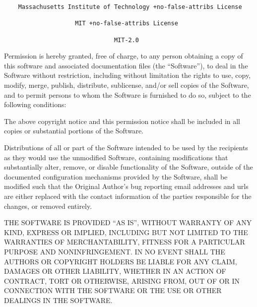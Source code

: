 \begin{verbatim}
    Massachusetts Institute of Technology +no-false-attribs License

                    MIT +no-false-attribs License

                               MIT-2.0
\end{verbatim}

Permission is hereby granted, free of charge, to any person obtaining a
copy of this software and associated documentation files (the
``Software''), to deal in the Software without restriction, including
without limitation the rights to use, copy, modify, merge, publish,
distribute, sublicense, and/or sell copies of the Software, and to
permit persons to whom the Software is furnished to do so, subject to
the following conditions:

The above copyright notice and this permission notice shall be included
in all copies or substantial portions of the Software.

Distributions of all or part of the Software intended to be used by the
recipients as they would use the unmodified Software, containing
modifications that substantially alter, remove, or disable functionality
of the Software, outside of the documented configuration mechanisms
provided by the Software, shall be modified such that the Original
Author's bug reporting email addresses and urls are either replaced with
the contact information of the parties responsible for the changes, or
removed entirely.

THE SOFTWARE IS PROVIDED ``AS IS'', WITHOUT WARRANTY OF ANY KIND,
EXPRESS OR IMPLIED, INCLUDING BUT NOT LIMITED TO THE WARRANTIES OF
MERCHANTABILITY, FITNESS FOR A PARTICULAR PURPOSE AND NONINFRINGEMENT.
IN NO EVENT SHALL THE AUTHORS OR COPYRIGHT HOLDERS BE LIABLE FOR ANY
CLAIM, DAMAGES OR OTHER LIABILITY, WHETHER IN AN ACTION OF CONTRACT,
TORT OR OTHERWISE, ARISING FROM, OUT OF OR IN CONNECTION WITH THE
SOFTWARE OR THE USE OR OTHER DEALINGS IN THE SOFTWARE.
